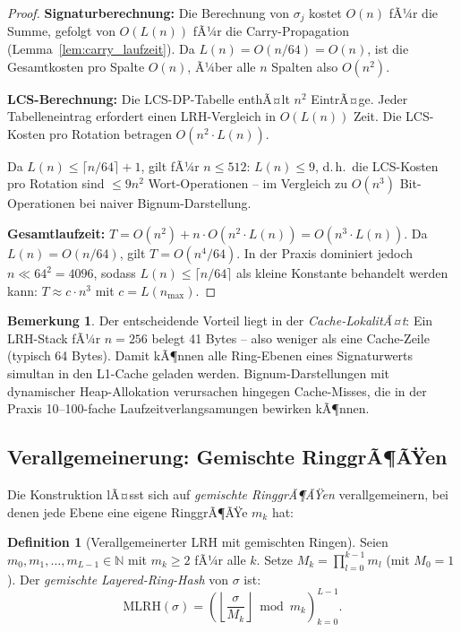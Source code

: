 ﻿\documentclass[a4paper,12pt]{article}
\theoremstyle{definition}
\newtheorem{definition}{Definition}
\newtheorem{bemerkung}{Bemerkung}
\begin{document}
\begin{proof}
\textbf{Signaturberechnung:} Die Berechnung von $\sigma_j$ kostet $O(n)$ fÃ¼r die
Summe, gefolgt von $O(L(n))$ fÃ¼r die Carry-Propagation (Lemma~\ref{lem:carry_laufzeit}).
Da $L(n) = O(n/64) = O(n)$, ist die Gesamtkosten pro Spalte $O(n)$, Ã¼ber alle $n$
Spalten also $O(n^2)$.

\textbf{LCS-Berechnung:} Die LCS-DP-Tabelle enthÃ¤lt $n^2$ EintrÃ¤ge. Jeder
Tabelleneintrag erfordert einen LRH-Vergleich in $O(L(n))$ Zeit.
Die LCS-Kosten pro Rotation betragen $O(n^2 \cdot L(n))$.

Da $L(n) \leq \lceil n/64 \rceil + 1$, gilt fÃ¼r $n \leq 512$: $L(n) \leq 9$,
d.\,h.\ die LCS-Kosten pro Rotation sind $\leq 9 n^2$ Wort-Operationen -- im
Vergleich zu $O(n^3)$ Bit-Operationen bei naiver Bignum-Darstellung.

\textbf{Gesamtlaufzeit:}
$T = O(n^2) + n \cdot O(n^2 \cdot L(n)) = O(n^3 \cdot L(n))$.
Da $L(n) = O(n/64)$, gilt $T = O(n^4 / 64)$. In der Praxis dominiert jedoch
$n \ll 64^2 = 4096$, sodass $L(n) \leq \lceil n/64 \rceil$ als kleine Konstante
behandelt werden kann: $T \approx c \cdot n^3$ mit $c = L(n_{\max})$.
\end{proof}

\begin{bemerkung}
Der entscheidende Vorteil liegt in der \emph{Cache-LokalitÃ¤t}: Ein LRH-Stack fÃ¼r
$n=256$ belegt 41 Bytes -- also weniger als eine Cache-Zeile (typisch 64 Bytes).
Damit kÃ¶nnen alle Ring-Ebenen eines Signaturwerts simultan in den L1-Cache geladen
werden. Bignum-Darstellungen mit dynamischer Heap-Allokation verursachen hingegen
Cache-Misses, die in der Praxis 10--100-fache Laufzeitverlangsamungen bewirken kÃ¶nnen.
\end{bemerkung}

\subsection{Verallgemeinerung: Gemischte RinggrÃ¶ÃŸen}

Die Konstruktion lÃ¤sst sich auf \emph{gemischte RinggrÃ¶ÃŸen} verallgemeinern, bei
denen jede Ebene eine eigene RinggrÃ¶ÃŸe $m_k$ hat:

\begin{definition}[Verallgemeinerter LRH mit gemischten Ringen]
Seien $m_0, m_1, \ldots, m_{L-1} \in \mathbb{N}$ mit $m_k \geq 2$ fÃ¼r alle $k$.
Setze $M_k = \prod_{l=0}^{k-1} m_l$ (mit $M_0 = 1$). Der
\emph{gemischte Layered-Ring-Hash} von $\sigma$ ist:
\[
  \mathrm{MLRH}(\sigma) = \left(
    \left\lfloor \frac{\sigma}{M_k} \right\rfloor \bmod m_k
  \right)_{k=0}^{L-1}.
\]
\end{definition}
\end{document}
